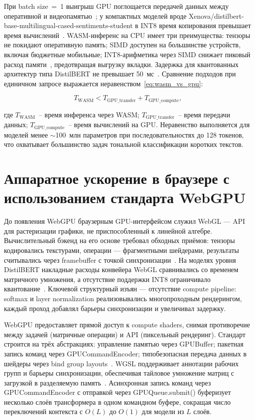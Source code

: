 При batch size~=~1 выигрыш GPU поглощается передачей данных между оперативной и видеопамятью~\cite{ruan2024webllm}; у компактных моделей вроде Xenova/distilbert-base-multilingual-cased-sentiments-student в INT8 время копирования превышает время вычислений~\cite{wang2024anatomizing}. WASM-инференс на CPU имеет три преимущества: тензоры не покидают оперативную память; SIMD доступен на большинстве устройств, включая бюджетные мобильные; INT8-арифметика через SIMD снижает пиковый расход памяти~\cite{husom2025sustainable}, предотвращая выгрузку вкладки. Задержка для квантованных архитектур типа DistilBERT не превышает 50~мс~\cite{sanh2019distilbert}. Сравнение подходов при единичном запросе выражается неравенством~\eqref{eq:wasm_vs_gpu}:

\begin{equation}
    T_{\text{WASM}} < T_{\text{GPU\_transfer}} + T_{\text{GPU\_compute}},
    \label{eq:wasm_vs_gpu}
\end{equation}

\noindent где $T_{\text{WASM}}$~– время инференса через WASM; $T_{\text{GPU\_transfer}}$~– время передачи данных; $T_{\text{GPU\_compute}}$~– время вычислений на GPU. Неравенство выполняется для моделей менее $\sim$100~млн параметров при последовательностях до 128 токенов, что охватывает большинство задач тональной классификации коротких текстов.


\section{Аппаратное ускорение в браузере с использованием стандарта WebGPU} \label{sec:аппаратное_ускорение_в_браузере_с_использованием_стандарта_webgpu}

До появления WebGPU браузерным GPU-интерфейсом служил WebGL — API для растеризации графики, не приспособленный к линейной алгебре. Вычислительный бэкенд на его основе требовал обходных приёмов: тензоры кодировались текстурами, операции — фрагментными шейдерами, результаты считывались через framebuffer с точкой синхронизации~\cite{wang2024anatomizing}. На моделях уровня DistilBERT накладные расходы конвейера WebGL сравнивались со временем матричного умножения, а отсутствие поддержки INT8 ограничивало квантование~\cite{gholami2021quantization}. Ключевой структурный изъян — отсутствие compute pipeline: softmax и layer normalization реализовывались многопроходным рендерингом, каждый проход добавлял барьеры синхронизации и увеличивал задержку.

WebGPU предоставляет прямой доступ к compute shaders, снимая противоречие между задачей (матричные операции) и API (пиксельный рендеринг). Стандарт строится на трёх абстракциях: управление памятью через GPUBuffer; пакетная запись команд через GPUCommandEncoder; типобезопасная передача данных в шейдеры через bind group layouts~\cite{ruan2024webllm}. WGSL поддерживает аннотации рабочих групп и барьеры синхронизации, обеспечивая тайловое умножение матриц с загрузкой в разделяемую память~\cite{jia2024empowering}. Асинхронная запись команд через GPUCommandEncoder с отправкой через GPUQueue.submit() буферизует несколько слоёв трансформера в одном командном буфере, сокращая число переключений контекста с $O(L)$ до $O(1)$ для модели из $L$ слоёв.

